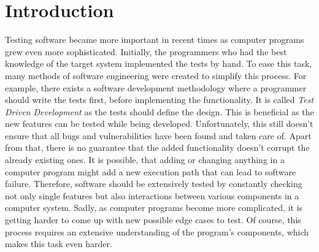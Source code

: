 \clearpage %
\section{Introduction} \label{chap:intr}

Testing software became more important in recent times as computer programs grew even more sophisticated. Initially, the programmers who had the best knowledge of the target system implemented the tests by hand. To ease this task, many methods of software engineering were created to simplify this process. For example, there exists a software development methodology where a programmer should write the tests first, before implementing the functionality. It is called \textit{Test Driven Development} as the tests should define the design. This is beneficial as the new features can be tested while being developed. Unfortunately, this still doesn't ensure that all bugs and vulnerabilities have been found and taken care of. Apart from that, there is no guarantee that the added functionality doesn't corrupt the already existing ones. It is possible, that adding or changing anything in a computer program might add a new execution path that can lead to software failure. Therefore, software should be extensively tested by constantly checking not only single features but also interactions between various components in a computer system. Sadly, as computer programs become more complicated, it is getting harder to come up with new possible edge cases to test. Of course, this process requires an extensive understanding of the program's components, which makes this task even harder. 

